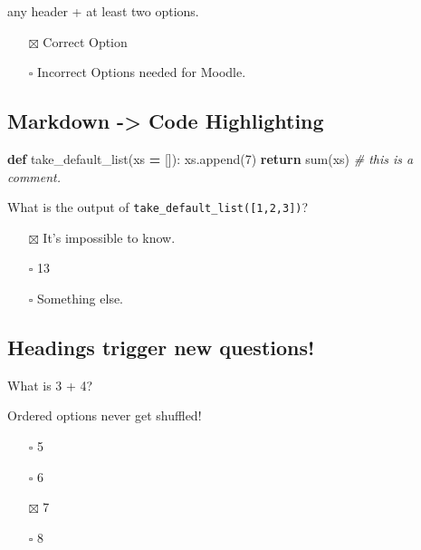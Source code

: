 \documentclass[
]{book}
\newenvironment{Shaded}{\begin{snugshade}}{\end{snugshade}}
\newcommand{\BuiltInTok}[1]{#1}
\newcommand{\CommentTok}[1]{\textcolor[rgb]{0.56,0.35,0.01}{\textit{#1}}}
\newcommand{\ControlFlowTok}[1]{\textcolor[rgb]{0.13,0.29,0.53}{\textbf{#1}}}
\newcommand{\DecValTok}[1]{\textcolor[rgb]{0.00,0.00,0.81}{#1}}
\newcommand{\KeywordTok}[1]{\textcolor[rgb]{0.13,0.29,0.53}{\textbf{#1}}}
\newcommand{\NormalTok}[1]{#1}
\newcommand{\OperatorTok}[1]{\textcolor[rgb]{0.81,0.36,0.00}{\textbf{#1}}}
\providecommand{\tightlist}{%
  \setlength{\itemsep}{0pt}\setlength{\parskip}{0pt}}
\theoremstyle{definition}
\theoremstyle{definition}
\theoremstyle{definition}
\theoremstyle{definition}
\theoremstyle{remark}
\begin{document}
any header + at least two options.

\begin{itemize}
\tightlist
\item[$\boxtimes$]
  Correct Option
\item[$\square$]
  Incorrect Options needed for Moodle.
\end{itemize}

\hypertarget{markdown---code-highlighting}{%
\subsection{Markdown -\textgreater{} Code Highlighting}\label{markdown---code-highlighting}}

\begin{Shaded}
\begin{Highlighting}[]
\KeywordTok{def}\NormalTok{ take\_default\_list(xs }\OperatorTok{=}\NormalTok{ []):}
\NormalTok{xs.append(}\DecValTok{7}\NormalTok{)}
\ControlFlowTok{return} \BuiltInTok{sum}\NormalTok{(xs) }\CommentTok{\# this is a comment.}
\end{Highlighting}
\end{Shaded}

What is the output of \texttt{take\_default\_list({[}1,2,3{]})}?

\begin{itemize}
\tightlist
\item[$\boxtimes$]
  It's impossible to know.
\item[$\square$]
  13
\item[$\square$]
  Something else.
\end{itemize}

\hypertarget{headings-trigger-new-questions}{%
\subsection{Headings trigger new questions!}\label{headings-trigger-new-questions}}

What is 3 + 4?

Ordered options never get shuffled!

\begin{enumerate}
\def\labelenumi{\arabic{enumi}.}
\tightlist
\item[$\square$]
  5
\item[$\square$]
  6
\item[$\boxtimes$]
  7
\item[$\square$]
  8
\end{enumerate}
\end{document}
